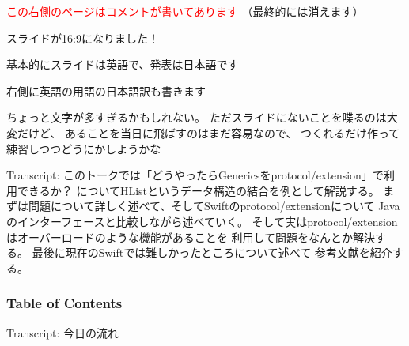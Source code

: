 \begin{frame}
  \vspace{5ex}
  \centering
  \maketitle
  
  \begin{notes}
    \item \textcolor{red}{この右側のページはコメントが書いてあります}
    （最終的には消えます）

    \item スライドが16:9になりました！

    \item 基本的にスライドは英語で、発表は日本語です

    \item 右側に英語の用語の日本語訳も書きます

    \item ちょっと文字が多すぎるかもしれない。
    ただスライドにないことを喋るのは大変だけど、
    あることを当日に飛ばすのはまだ容易なので、
    つくれるだけ作って練習しつつどうにかしようかな

    \item Transcript:
    このトークでは「どうやったらGenericsをprotocol/extension」で利用できるか？
    についてHListというデータ構造の結合を例として解説する。
    まずは問題について詳しく述べて、そしてSwiftのprotocol/extensionについて
    Javaのインターフェースと比較しながら述べていく。
    そして実はprotocol/extensionはオーバーロードのような機能があることを
    利用して問題をなんとか解決する。
    最後に現在のSwiftでは難しかったところについて述べて
    参考文献を紹介する。
  \end{notes}
\end{frame}

\begin{frame}
  \frametitle{Table of Contents}

  \tableofcontents

  \begin{notes}
    \item Transcript:
    今日の流れ
  \end{notes}
\end{frame}

